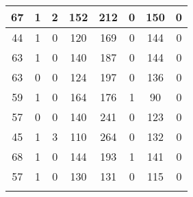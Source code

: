 \documentclass{article}
\begin{document}
\begin{longtable}{|c|c|c|c|c|c|c|c|}
67 & 1 & 2 & 152 & 212 & 0 & 150 & 0 \\ \hline
44 & 1 & 0 & 120 & 169 & 0 & 144 & 0 \\ \hline
63 & 1 & 0 & 140 & 187 & 0 & 144 & 0 \\ \hline
63 & 0 & 0 & 124 & 197 & 0 & 136 & 0 \\ \hline
59 & 1 & 0 & 164 & 176 & 1 & 90 & 0 \\ \hline
57 & 0 & 0 & 140 & 241 & 0 & 123 & 0 \\ \hline
45 & 1 & 3 & 110 & 264 & 0 & 132 & 0 \\ \hline
68 & 1 & 0 & 144 & 193 & 1 & 141 & 0 \\ \hline
57 & 1 & 0 & 130 & 131 & 0 & 115 & 0 \\ \hline
 \\ \hline
\end{longtable}
\end{document}
